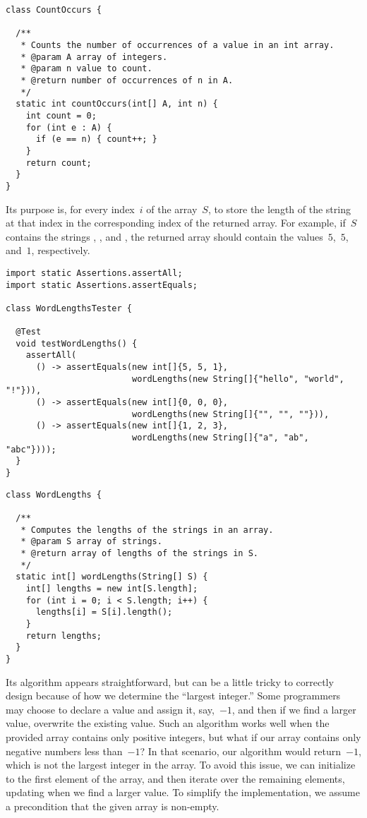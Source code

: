 \begin{lstlisting}[language=MyJava]
class CountOccurs {

  /** 
   * Counts the number of occurrences of a value in an int array.
   * @param A array of integers.
   * @param n value to count.
   * @return number of occurrences of n in A.
   */
  static int countOccurs(int[] A, int n) {
    int count = 0;
    for (int e : A) {
      if (e == n) { count++; }
    }
    return count;
  }
}
\end{lstlisting}

Its purpose is, for every index~$i$ of the array~$S$, to store the length of the string at that index in the corresponding index of the returned array.
For example, if~$S$ contains the strings , , and , the returned array should contain the values~$5$,~$5$, and~$1$, respectively.

\enlargethispage{2\baselineskip}
\begin{lstlisting}[language=MyJava]
import static Assertions.assertAll;
import static Assertions.assertEquals;

class WordLengthsTester {

  @Test
  void testWordLengths() {
    assertAll(
      () -> assertEquals(new int[]{5, 5, 1}, 
                         wordLengths(new String[]{"hello", "world", "!"})),
      () -> assertEquals(new int[]{0, 0, 0}, 
                         wordLengths(new String[]{"", "", ""})),
      () -> assertEquals(new int[]{1, 2, 3}, 
                         wordLengths(new String[]{"a", "ab", "abc"})));
  }
}
\end{lstlisting}

\begin{lstlisting}[language=MyJava]
class WordLengths {

  /**
   * Computes the lengths of the strings in an array.
   * @param S array of strings.
   * @return array of lengths of the strings in S.
   */
  static int[] wordLengths(String[] S) {
    int[] lengths = new int[S.length];
    for (int i = 0; i < S.length; i++) {
      lengths[i] = S[i].length();
    }
    return lengths;
  }
}
\end{lstlisting}

Its algorithm appears straightforward, but can be a little tricky to correctly design because of how we determine the ``largest integer.'' 
Some programmers may choose to declare a value  and assign it, say,~$-1$, and then if we find a larger value, overwrite the existing value. 
Such an algorithm works well when the provided array contains only positive integers, but what if our array contains only negative numbers less than~$-1$? 
In that scenario, our algorithm would return~$-1$, which is not the largest integer in the array. 
To avoid this issue, we can initialize  to the first element of the array, and then iterate over the remaining elements, updating  when we find a larger value.
To simplify the implementation, we assume a precondition that the given array is non-empty.

